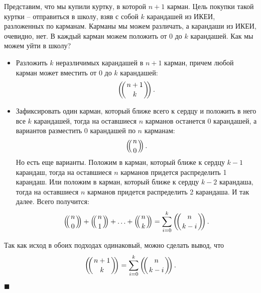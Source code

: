 \documentclass{article}
\def\multiset#1#2{\ensuremath{\left(\kern-.3em\left(\genfrac{}{}{0pt}{}{#1}{#2}\right)\kern-.3em\right)}}
\begin{document}
\begin{enumerate}
    Представим, что мы купили куртку, в которой $n + 1$ карман. Цель покупки такой куртки -- отправиться в школу, взяв с собой $k$ карандашей из ИКЕИ, разложенных по карманам. Карманы мы можем различать, а карандаши из ИКЕИ, очевидно, нет. В каждый карман можем положить от 0 до $k$ карандашей. Как мы можем уйти в школу?
    \begin{itemize}
      \item Разложить $k$ неразличимых карандашей в $n + 1$ карман, причем любой карман может вместить от 0 до $k$ карандашей:
      \begin{equation}
        \multiset{n + 1}{k}.
      \end{equation}
      \item Зафиксировать один карман, который ближе всего к сердцу и положить в него все $k$ карандашей, тогда на оставшиеся $n$ карманов останется 0 карандашей, а вариантов разместить 0 карандашей по $n$ карманам:
      \begin{equation}
        \multiset{n}{0}.
      \end{equation}
      Но есть еще варианты. Положим в карман, который ближе к сердцу $k-1$ карандаш, тогда на оставшиеся $n$ карманов придется распределить 1 карандаш. Или положим в карман, который ближе к сердцу $k-2$ карандаша, тогда на оставшиеся $n$ карманов придется распределить 2 карандаша. И так далее. Всего получится:
      \begin{equation}
        \multiset{n}{0} + \multiset{n}{1} + \ldots + \multiset{n}{k} = \sum_{i = 0}^{k} \multiset{n}{k - i}.
      \end{equation}
    \end{itemize}
    Так как исход в обоих подходах одинаковый, можно сделать вывод, что
    \begin{equation}
      \multiset{n + 1}{k} = \sum_{i = 0}^{k} \multiset{n}{k - i}.
    \end{equation}

    \begin{flushright}
      $\blacksquare$
    \end{flushright}
    
      
  \end{enumerate}
\end{document}
